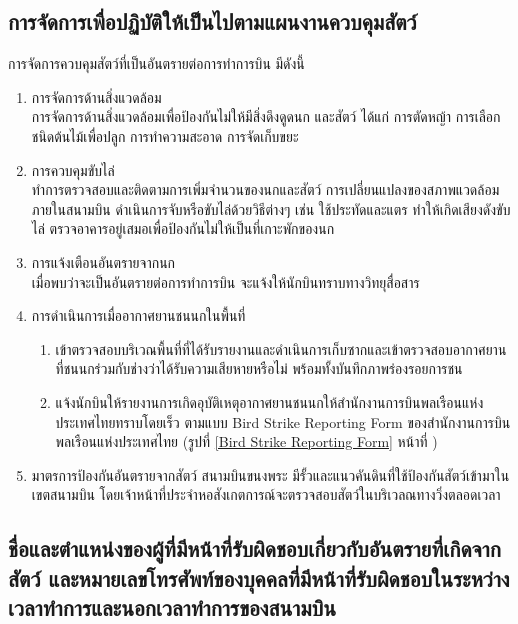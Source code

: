\subsection{การจัดการเพื่อปฏิบัติให้เป็นไปตามแผนงานควบคุมสัตว์}

การจัดการควบคุมสัตว์ที่เป็นอันตรายต่อการทำการบิน มีดังนี้

\begin{enumerate}
\item การจัดการด้านสิ่งแวดล้อม \\
การจัดการด้านสิ่งแวดล้อมเพื่อป้องกันไม่ให้มีสิ่งดึงดูดนก และสัตว์ ได้แก่ การตัดหญ้า การเลือกชนิดต้นไม้เพื่อปลูก การทำความสะอาด การจัดเก็บขยะ
\item การควบคุมขับไล่ \\
ทำการตรวจสอบและติดตามการเพิ่มจำนวนของนกและสัตว์ การเปลี่ยนแปลงของสภาพแวดล้อมภายในสนามบิน ดำเนินการจับหรือขับไล่ด้วยวิธีต่างๆ เช่น ใช้ประทัดและแตร ทำให้เกิดเสียงดังขับไล่ ตรวจอาคารอยู่เสมอเพื่อป้องกันไม่ให้เป็นที่เกาะพักของนก
\item การแจ้งเตือนอันตรายจากนก \\
เมื่อพบว่าจะเป็นอันตรายต่อการทำการบิน จะแจ้งให้นักบินทราบทางวิทยุสื่อสาร
\item การดำเนินการเมื่ออากาศยานชนนกในพื้นที่
	\begin{enumerate}
	\item เข้าตรวจสอบบริเวณพื้นที่ที่ได้รับรายงานและดำเนินการเก็บซากและเข้าตรวจสอบอากาศยานที่ชนนกร่วมกับช่างว่าได้รับความเสียหายหรือไม่ พร้อมทั้งบันทึกภาพร่องรอยการชน
	\item แจ้งนักบินให้รายงานการเกิดอุบัติเหตุอากาศยานชนนกให้สำนักงานการบินพลเรือนแห่งประเทศไทยทราบโดยเร็ว ตามแบบ Bird Strike Reporting Form ของสำนักงานการบินพลเรือนแห่งประเทศไทย (รูปที่ \ref{Bird Strike Reporting Form} หน้าที่ \pageref{แบบฟอร์ม Bird Strike Report Form ของ สำนักงานการบินพลเรือนแห่งประเทศไทย})
	\end{enumerate}
\item มาตรการป้องกันอันตรายจากสัตว์
สนามบินขนงพระ มีรั้วและแนวคันดินที่ใช้ป้องกันสัตว์เข้ามาในเขตสนามบิน โดยเจ้าหน้าที่ประจำหอสังเกตการณ์จะตรวจสอบสัตว์ในบริเวลณทางวิ่งตลอดเวลา
\end{enumerate}

\subsection{ชื่อและตำแหน่งของผู้ที่มีหน้าที่รับผิดชอบเกี่ยวกับอันตรายที่เกิดจากสัตว์
และหมายเลขโทรศัพท์ของบุคคลที่มีหน้าที่รับผิดชอบในระหว่างเวลาทำการและนอกเวลาทำการของสนามบิน}

